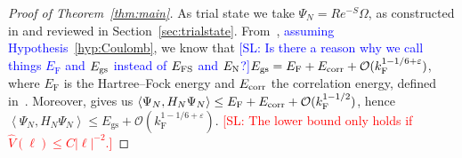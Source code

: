 \documentclass[12pt,a4paper]{article}
\numberwithin{equation}{section}
\newcommand{\cO}{\mathcal{O}}
\newcommand{\1}{\mathbb{I}}
\newcommand{\corr}{\textnormal{corr}}
\newcommand{\F}{\mathrm{F}}
\newcommand{\GS}{\mathrm{gs}}
\newcommand{\eva}[1]{\left\langle #1 \right\rangle}
\theoremstyle{plain}
\theoremstyle{definition}
\theoremstyle{remark}
\theoremstyle{plain}
\theoremstyle{definition}
\theoremstyle{remark}
\begin{document}
\begin{proof}[Proof of Theorem~\ref{thm:main}]
As trial state we take $ \Psi_N = R e^{-S} \Omega $, as constructed in \cite{CHN23} and reviewed in Section~\ref{sec:trialstate}. From~\cite[Corr.~1.3]{CHN24}, \textcolor{blue}{assuming Hypothesis~\ref{hyp:Coulomb}}, we know that \textcolor{blue}{[SL: Is there a reason why we call things $ E_{\F} $ and $ E_{\textnormal{gs}} $ instead of $ E_{\textnormal{FS}} $ and $ E_{\textnormal{N}} $?]}$ E_{\GS} = E_{\F} + E_{\corr} + \cO(k_{\F}^{1 - 1/6 + \varepsilon}) $, where $ E_{\F} $ is the Hartree--Fock energy and $ E_{\corr}$ the correlation energy, defined in~\cite[(1.2) and (1.11)]{CHN24}. Moreover, \cite[Thm.~1.1]{CHN23} gives us $ \eva{\Psi_N, H_N \Psi_N} \le E_{\F} + E_{\corr} + \cO(k_{\F}^{1 - 1/2}) $, hence $ \eva{\Psi_N, H_N \Psi_N} \le E_{\GS} + \cO(k_{\F}^{1 - 1/6+ \varepsilon}) $. \textcolor{red}{[SL: The lower bound only holds if $ \hat{V}(\ell) \le C |\ell|^{-2} $.]}


\end{proof}
\end{document}
